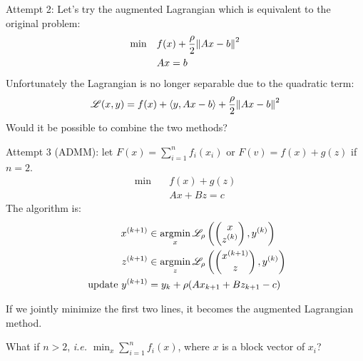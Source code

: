 \documentclass[class=article,crop=false]{standalone}
\begin{document}
Attempt 2: Let's try the augmented Lagrangian which is equivalent to the original problem:
\begin{align*}
	\min \quad &f(x) + \frac{\rho}{2} {\left\lVert{ Ax-b}\right\rVert}^2 \\
		   &Ax=b
\end{align*}
Unfortunately the Lagrangian is no longer separable due to the quadratic term:
\begin{align*}
	\mathscr{L}(x,y) = f(x) + \langle y,Ax-b \rangle + \frac{\rho}{2} {\left\lVert{ Ax-b}\right\rVert}^2 
\end{align*}
Would it be possible to combine the two methods?

Attempt 3 (ADMM): let $ F(x) = \sum_{ i= 1}^{ n} f_i(x_i)$ or $ F(v) =  f(x) + g(z)$ if $ n=2$. 
\begin{align*}
	\min \quad & f(x) + g(z)\\
		   & Ax+ Bz = c
\end{align*}
The algorithm is:
\begin{align*}
	x^{(k+1)} &\in \operatorname*{argmin}_{x} \mathscr{L}_{\rho} \left( \begin{pmatrix} x\\z^{(k)} \end{pmatrix}, y^{(k)}  \right) \\
	z^{(k+1)} &\in \operatorname*{argmin}_{z} \mathscr{L}_{\rho} \left( \begin{pmatrix} x^{(k+1)}\\z \end{pmatrix}, y^{(k)}  \right) \\
	\text{ update } y^{(k+1)} &= y_k + \rho (A x_{k+1}+ B z_{k+1}-c)
\end{align*}
\begin{note}
	If we jointly minimize the first two lines, it becomes the augmented Lagrangian method.
\end{note}

What if $ n>2$, \emph{i.e.} $ \min_x \sum_{ i= 1}^{ n} f_i(x)$, where $ x$ is a block vector of $ x_i$?
\end{document}
